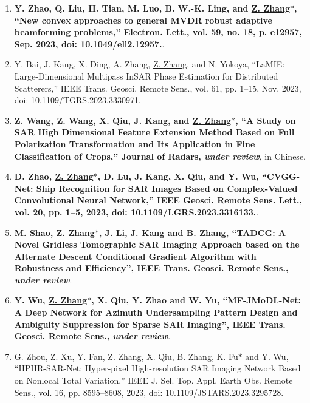\documentclass[paper=a4,fontsize=11pt]{scrartcl}
\begin{document}
\begin{enumerate}
	
	\item \textbf{Y. Zhao, Q. Liu, H. Tian, M. Luo, B. W.-K. Ling, and \underline{Z. Zhang$\ast$}, ``New convex approaches to general MVDR robust adaptive beamforming problems,'' Electron. Lett., vol. 59, no. 18, p. e12957, Sep. 2023, doi: 10.1049/ell2.12957.}.
	
	\item Y. Bai, J. Kang, X. Ding, A. Zhang, \underline{Z. Zhang}, and N. Yokoya, ``LaMIE: Large-Dimensional Multipass InSAR Phase Estimation for Distributed Scatterers,'' IEEE Trans. Geosci. Remote Sens., vol. 61, pp. 1–15, Nov. 2023, doi: 10.1109/TGRS.2023.3330971.
		
	\item \textbf{Z. Wang, Z. Wang, X. Qiu, J. Kang, and \underline{Z. Zhang$\ast$}, ``A Study on SAR High	Dimensional Feature Extension Method Based on Full Polarization Transformation and Its Application in Fine Classification of Crops,'' Journal of Radars, \emph{under review}}, in Chinese.
	
	\item \textbf{D. Zhao, \underline{Z. Zhang$\ast$}, D. Lu, J. Kang, X. Qiu, and Y. Wu, ``CVGG-Net: Ship Recognition for SAR Images Based on Complex-Valued Convolutional Neural Network,'' IEEE Geosci. Remote Sens. Lett., vol. 20, pp. 1–5, 2023, doi: 10.1109/LGRS.2023.3316133.}.​
	
	\item \textbf{M. Shao, \underline{Z. Zhang$\ast$}, J. Li, J. Kang and B. Zhang, ``TADCG: A Novel Gridless Tomographic SAR Imaging Approach based on the Alternate Descent Conditional Gradient Algorithm with Robustness and Efficiency'', IEEE Trans. Geosci. Remote Sens., \emph{under review}}.
	
	\item \textbf{Y. Wu, \underline{Z. Zhang$\ast$}, X. Qiu, Y. Zhao and W. Yu, ``MF-JMoDL-Net: A Deep Network for Azimuth Undersampling Pattern Design and Ambiguity Suppression for Sparse SAR Imaging'', IEEE Trans. Geosci. Remote Sens., \emph{under review}}.
	
	\item G. Zhou, Z. Xu, Y. Fan, \underline{Z. Zhang}, X. Qiu, B. Zhang, K. Fu$\ast$ and Y. Wu, ``HPHR-SAR-Net: Hyper-pixel High-resolution SAR Imaging Network Based on Nonlocal Total Variation,'' IEEE J. Sel. Top. Appl. Earth Obs. Remote Sens., vol. 16, pp. 8595–8608, 2023, doi: 10.1109/JSTARS.2023.3295728.
	

\end{enumerate}
\end{document}
